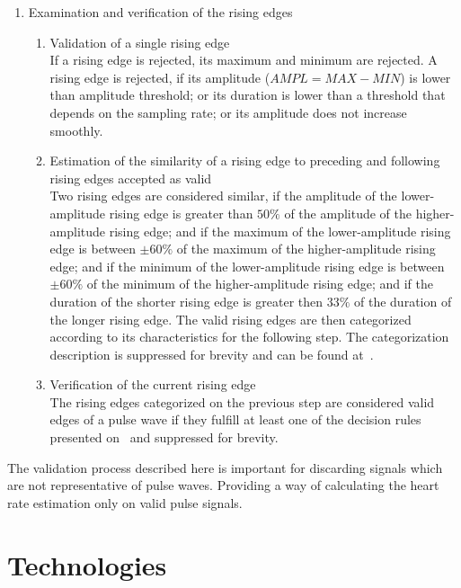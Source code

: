\begin{enumerate}
  \item Examination and verification of the rising edges
  \begin{enumerate}
    \item Validation of a single rising edge\\
          If a rising edge is rejected, its maximum and minimum are rejected.
          A rising edge is rejected, if its amplitude ($AMPL = MAX - MIN$) is
          lower than amplitude threshold; or its duration is lower than a
          threshold that depends on the sampling rate; or its amplitude does
          not increase smoothly.
    \item Estimation of the similarity of a rising edge to preceding and
          following rising edges accepted as valid\\
          Two rising edges are considered similar, if the amplitude of the
          lower-amplitude rising edge is greater than $50\%$ of the amplitude
          of the higher-amplitude rising edge; and if the maximum of the
          lower-amplitude rising edge is between $\pm60\%$ of the maximum of
          the higher-amplitude rising edge; and if the minimum of the
          lower-amplitude rising edge is between $\pm60\%$ of the minimum of
          the higher-amplitude rising edge; and if the duration of the shorter
          rising edge is greater then $33\%$ of the duration of the longer
          rising edge. The valid rising edges are then categorized according
          to its characteristics for the following step. The categorization
          description is suppressed for brevity and can be found
          at~\cite{Nenova2010Automated}.
    \item Verification of the current rising edge\\
          The rising edges categorized on the previous step are considered
          valid edges of a pulse wave if they fulfill at least one of the
          decision rules presented on~\cite{Nenova2010Automated} and suppressed
          for brevity.
  \end{enumerate}
\end{enumerate}

The validation process described here is important for discarding signals
which are not representative of pulse waves. Providing a way of calculating
the heart rate estimation only on valid pulse signals.

\section{Technologies} \label{sec:sota:tech}


